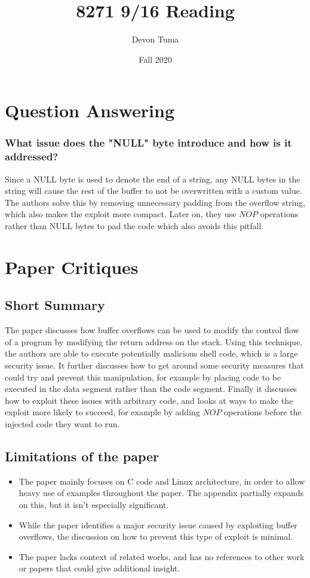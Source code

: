 \documentclass[11pt]{article}
\title{8271 9/16 Reading}
\author{Devon Tuma}
\date{Fall 2020}
\begin{document}
\maketitle

\section*{Question Answering}

\subsubsection*{What issue does the "NULL" byte introduce and how is it addressed?}

Since a NULL byte is used to denote the end of a string, any NULL bytes in the string will cause the rest of the buffer to not be overwritten with a custom value.
The authors solve this by removing unnecessary padding from the overflow string, which also makes the exploit more compact.
Later on, they use $NOP$ operations rather than NULL bytes to pad the code which also avoids this pitfall.

\section*{Paper Critiques}

\subsection*{Short Summary}

The paper discusses how buffer overflows can be used to modify the control flow of a program by modifying the return address on the stack.
Using this technique, the authors are able to execute potentially malicious shell code, which is a large security issue.
It further discusses how to get around some security measures that could try and prevent this manipulation, for example by placing code to be executed in the data segment rather than the code segment.
Finally it discusses how to exploit these issues with arbitrary code, and looks at ways to make the exploit more likely to succeed, for example by adding $NOP$ operations before the injected code they want to run.

\subsection*{Limitations of the paper}

\begin{itemize}
\item The paper mainly focuses on C code and Linux architecture, in order to allow heavy use of examples throughout the paper. The appendix partially expands on this, but it isn't especially significant.
\item While the paper identifies a major security issue caused by exploiting buffer overflows, the discussion on how to prevent this type of exploit is minimal.
\item The paper lacks context of related works, and has no references to other work or papers that could give additional insight.
\end{itemize}
\end{document}

